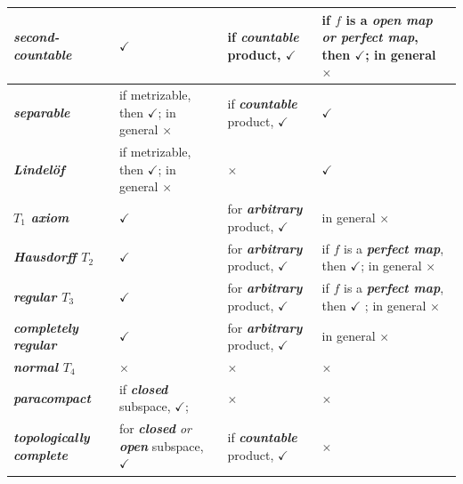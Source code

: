\documentclass[11pt]{article}
\begin{document}
\begin{table}[h!]
\begin{tabularx}{1\textwidth} { 
  | >{\raggedright\arraybackslash} m{3cm}
  | >{\centering\arraybackslash}X
  | >{\centering\arraybackslash}X
  | >{\centering\arraybackslash}X  | }
\hline \vspace{5pt}
\emph{\textbf{second-countable}}  \vspace{2pt}  &  $\checkmark$ & if \emph{\textbf{countable}} product, $\checkmark$ &  if $f$ is a \emph{\textbf{open map or perfect map}}, then $\checkmark$; in general $\times$ \\
\hline \vspace{5pt}
\emph{\textbf{separable}}  \vspace{2pt}  & if metrizable, then $\checkmark$; in general $\times$ & if \emph{\textbf{countable}} product, $\checkmark$  & $\checkmark$\\
\hline \vspace{5pt}
\emph{\textbf{Lindel\"of}}  \vspace{2pt}  & if metrizable, then $\checkmark$; in general $\times$  & $\times$ & $\checkmark$ \\
\hline \vspace{5pt}
\emph{\textbf{$T_1$ axiom}}  \vspace{2pt}  &  $\checkmark$ & for \emph{\textbf{arbitrary}} product, $\checkmark$ &  in general $\times$ \\
\hline \vspace{5pt}
\emph{\textbf{Hausdorff $T_2$}}  \vspace{2pt}   & $\checkmark$  & for \emph{\textbf{arbitrary}} product, $\checkmark$ & if $f$ is a \emph{\textbf{perfect map}}, then $\checkmark$; in general $\times$ \\
\hline \vspace{5pt}
\emph{\textbf{regular $T_3$}}  \vspace{2pt}  & $\checkmark$  & for \emph{\textbf{arbitrary}} product, $\checkmark$ & if $f$ is a \emph{\textbf{perfect map}}, then $\checkmark$ ; in general $\times$ \\
\hline \vspace{5pt}
\emph{\textbf{completely regular}}  \vspace{2pt}  & $\checkmark$  & for \emph{\textbf{arbitrary}} product, $\checkmark$ & in general $\times$ \\
\hline \vspace{5pt}
\emph{\textbf{normal $T_4$}}  \vspace{2pt}  & $\times$  & $\times$ &  $\times$ \\
\hline \vspace{5pt}
\emph{\textbf{paracompact}}  \vspace{2pt}  & if \emph{\textbf{closed}} subspace, $\checkmark$;  &  $\times$  &  $\times$ \\
\hline \vspace{5pt}
\emph{\textbf{topologically complete}}  \vspace{2pt}  & for \emph{\textbf{closed} or \textbf{open}} subspace, $\checkmark$  &  if \emph{\textbf{countable}} product, $\checkmark$  &  $\times$ \\
\hline
\end{tabularx}
\end{table}
\end{document}
